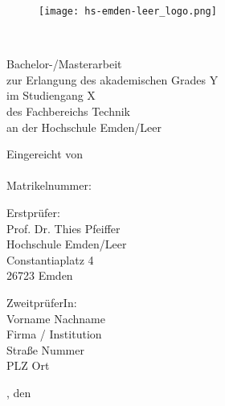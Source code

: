\begin{titlepage}

\begin{center}

\begin{figure}[tbh]
 \centering
 \texttt{[image: hs-emden-leer\_logo.png]}
\end{figure}

\vspace{1.5cm}

{
 \fontsize{24.88}{28}\selectfont
 \myTitle\\[0.5cm]
}

\fontsize{12}{12}\selectfont

\vspace{1.5cm}

Bachelor-/Masterarbeit\\
zur Erlangung des akademischen Grades Y\\
im Studiengang X\\
des Fachbereichs Technik\\
an der Hochschule Emden/Leer

\vspace{0.5cm}

Eingereicht von\\
\myAuthor\\
Matrikelnummer: \myMatrikelnummer

\vspace{0.5cm}

Erstprüfer:\\
Prof. Dr. Thies Pfeiffer\\
Hochschule Emden/Leer\\
Constantiaplatz 4\\
26723 Emden\\

\vspace{.2cm}

ZweitprüferIn:\\
Vorname Nachname\\
Firma / Institution\\
Straße Nummer\\
PLZ Ort

\vspace{0.5cm}

\myOrt, den \myDate

\end{center}
\end{titlepage}
